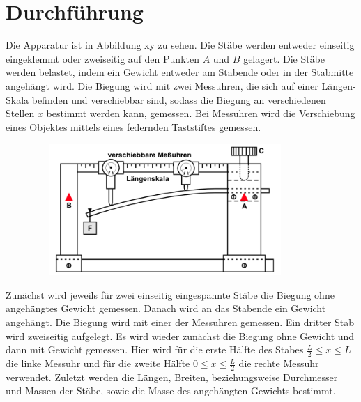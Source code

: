 \section{Durchführung}
Die Apparatur ist in Abbildung xy zu sehen. %
Die Stäbe werden entweder einseitig eingeklemmt oder zweiseitig
auf den Punkten $A$ und $B$ gelagert. Die Stäbe werden belastet, indem
ein Gewicht entweder am Stabende oder in der Stabmitte angehängt wird.
Die Biegung wird mit zwei Messuhren, die sich auf einer Längen-Skala befinden
und verschiebbar sind, sodass die Biegung an verschiedenen Stellen $x$ bestimmt
werden kann, gemessen. Bei Messuhren wird die Verschiebung eines Objektes mittels
eines federnden Taststiftes gemessen. %
\begin{figure}
    \centering
\includegraphics[width= 10cm, height= 5cm]{./plots/abb3.png}
\caption{}
\label{fig:abb3}
\end{figure}

Zunächst wird jeweils für zwei einseitig eingespannte Stäbe die Biegung ohne
angehängtes Gewicht gemessen. Danach wird an das Stabende ein Gewicht angehängt.
Die Biegung wird mit einer der Messuhren gemessen. %
Ein dritter Stab wird
zweiseitig aufgelegt. Es wird wieder zunächst die Biegung ohne Gewicht und dann
mit Gewicht gemessen. Hier wird für die erste Hälfte des Stabes $\frac{L}{2} \leq x \leq L$
die linke Messuhr und für die zweite Hälfte $0 \leq x \leq \frac{L}{2}$ die rechte Messuhr
verwendet. %
Zuletzt werden die Längen, Breiten, beziehungsweise Durchmesser und Massen der Stäbe,
sowie die Masse des angehängten Gewichts bestimmt.


\newpage



\nocite{*}
\newpage
\printbibliography

